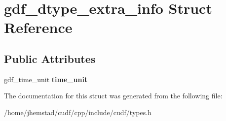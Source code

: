 \hypertarget{structgdf__dtype__extra__info}{}\section{gdf\+\_\+dtype\+\_\+extra\+\_\+info Struct Reference}
\label{structgdf__dtype__extra__info}
\subsection*{Public Attributes}
\begin{DoxyCompactItemize}
\item 
gdf\+\_\+time\+\_\+unit {\bfseries time\+\_\+unit}\hypertarget{structgdf__dtype__extra__info_addaa5a9b9786bcaa30a70942d339dec8}{}\label{structgdf__dtype__extra__info_addaa5a9b9786bcaa30a70942d339dec8}

\end{DoxyCompactItemize}


The documentation for this struct was generated from the following file\+:\begin{DoxyCompactItemize}
\item 
/home/jhemstad/cudf/cpp/include/cudf/types.\+h\end{DoxyCompactItemize}
